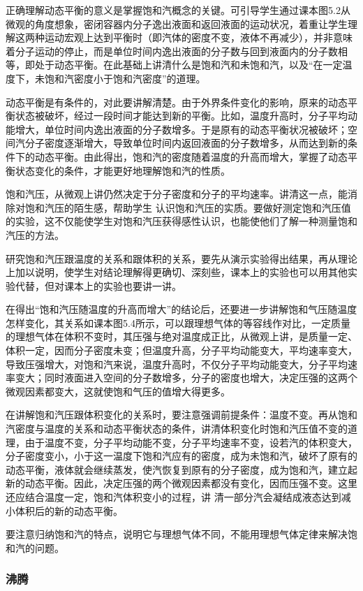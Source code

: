 正确理解动态平衡的意义是掌握饱和汽概念的关键。可引导学生通过课本图5.2从微观的角度想象，密闭容器内分子逸出液面和返回液面的运动状况，着重让学生理解这两种运动宏观上达到平衡时（即汽体的密度不变，液体不再减少），并非意味着分子运动的停止，而是单位时间内逸出液面的分子数与回到液面内的分子数相等，即处于动态平衡。在此基础上讲清什么是饱和汽和未饱和汽，以及“在一定温度下，未饱和汽密度小于饱和汽密度”的道理。

动态平衡是有条件的，对此要讲解清楚。由于外界条件变化的影响，原来的动态平衡状态被破坏，经过一段时间才能达到新的平衡。比如，温度升高时，分子平均动能增大，单位时间内逸出液面的分子数增多。于是原有的动态平衡状况被破坏；空间汽分子密度逐渐增大，导致单位时间内返回液面的分子数增多，从而达到新的条件下的动态平衡。由此得出，饱和汽的密度随着温度的升高而增大，掌握了动态平衡状态变化的条件，才能更好地理解饱和汽的性质。

饱和汽压，从微观上讲仍然决定于分子密度和分子的平均速率。讲清这一点，能消除对饱和汽压的陌生感，帮助学生
认识饱和汽压的实质。要做好测定饱和汽压值的实验，这不仅能使学生对饱和汽压获得感性认识，也能使他们了解一种测量饱和汽压的方法。

研究饱和汽压跟温度的关系和跟体积的关系，要先从演示实验得出结果，再从理论上加以说明，使学生对结论理解得更确切、深刻些，课本上的实验也可以用其他实验代替，但对课本上的实验也要讲一讲。

在得出“饱和汽压随温度的升高而增大”的结论后，还要进一步讲解饱和气压随温度怎样变化，其关系如课本图5.4所示，可以跟理想气体的等容线作对比，一定质量的理想气体在体积不变时，其压强与绝对温度成正比，从微观上讲，是质量一定、体积一定，因而分子密度未变；但温度升高，分子平均动能变大，平均速率变大，导致压强增大，对饱和汽来说，温度升高时，不仅分子平均动能变大，分子平均速率变大；同时液面进入空间的分子数增多，分子的密度也增大，决定压强的这两个微观因素都变大，这就使饱和气压的值增大得更多。

在讲解饱和汽压跟体积变化的关系时，要注意强调前提条件：温度不变。再从饱和汽密度与温度的关系和动态平衡状态的条件，讲清体积变化时饱和汽压值不变的道理，由于温度不变，分子平均动能不变，分子平均速率不变，设若汽的体积变大，分子密度变小，小于这一温度下饱和汽应有的密度，成为未饱和汽，破坏了原有的动态平衡，液体就会继续蒸发，使汽恢复到原有的分子密度，成为饱和汽，建立起新的动态平衡。因此，决定压强的两个微观因素都没有变化，因而压强不变。这里还应结合温度一定，饱和汽体积变小的过程，讲
清一部分汽会凝结成液态达到减小体积后的新的动态平衡。

要注意归纳饱和汽的特点，说明它与理想气体不同，不能用理想气体定律来解决饱和汽的问题。

\subsubsection{沸腾}

